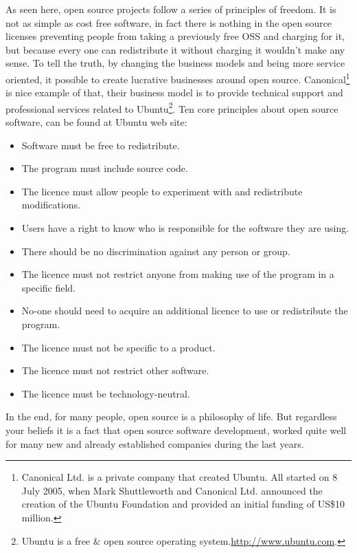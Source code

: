 As seen here, open source projects follow a series of principles of freedom. 
It is not as simple as cost free software, 
in fact there is nothing in the open source licenses preventing people from taking a previously free OSS and charging for it,
but because every one can redistribute it without charging it wouldn't make any sense.
To tell the truth, by changing the business models and being more service oriented,
it possible to create lucrative businesses around open source.
\textsf{Canonical}\footnote{
  Canonical Ltd. is a private company that created Ubuntu. 
  All started on 8 July 2005, when Mark Shuttleworth and Canonical Ltd. 
  announced the creation of the Ubuntu Foundation and provided an initial funding of US\$10 million.
}
is nice example of that, their business model is to provide technical support and professional services related to 
\textsf{Ubuntu}\footnote{
  Ubuntu is a free \& open source operating system.\url{http://www.ubuntu.com}.
}.
Ten core principles about open source software, can be found at Ubuntu web site:

\begin{itemize}
\item Software must be free to redistribute.
\item The program must include source code.
\item The licence must allow people to experiment with and redistribute modifications.
\item Users have a right to know who is responsible for the software they are using.
\item There should be no discrimination against any person or group.
\item The licence must not restrict anyone from making use of the program in a specific field.
\item No-one should need to acquire an additional licence to use or redistribute the program.
\item The licence must not be specific to a product.
\item The licence must not restrict other software.
\item The licence must be technology-neutral.
\end{itemize}

In the end, for many people, open source is a philosophy of life. 
But regardless your beliefs it is a fact that open source software development, 
worked quite well for many new and already established companies during the last years.


